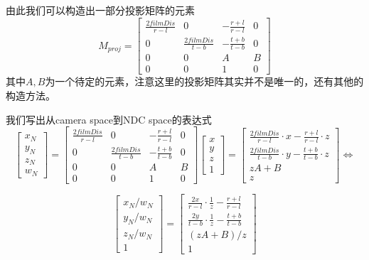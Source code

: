 由此我们可以构造出一部分投影矩阵的元素
\begin{displaymath}
M_{proj} = 
\begin{bmatrix}
\frac{2filmDis}{r - l} & 0  & -\frac{r + l}{r - l} & 0\\
0 & \frac{2filmDis}{t - b} & -\frac{t + b}{t - b} & 0\\
0 & 0 & A & B\\
0 & 0 & 1 & 0
\end{bmatrix}
\end{displaymath}
其中$A, B$为一个待定的元素，注意这里的投影矩阵其实并不是唯一的，还有其他的构造方法。

我们写出从camera space到NDC space的表达式
\begin{displaymath}
\begin{bmatrix}
x_N\\
y_N\\
z_N\\
w_N
\end{bmatrix} = 
\begin{bmatrix}
\frac{2filmDis}{r - l} & 0 & -\frac{r + l}{r - l} & 0\\
0 & \frac{2filmDis}{t - b} & -\frac{t + b}{t - b} & 0\\
0 & 0 & A & B\\
0 & 0 & 1 & 0
\end{bmatrix}
\begin{bmatrix}
x\\
y\\
z\\
1
\end{bmatrix} =
\left[\begin{gathered}
\frac{2filmDis}{r - l}\cdot x - \frac{r + l}{r - l} \cdot z\\
\frac{2filmDis}{t - b} \cdot y - \frac{t + b}{t - b}\cdot z\\
zA + B\\
z
\end{gathered}\right]\Leftrightarrow
\end{displaymath}

\begin{displaymath}
\begin{bmatrix}
x_N/w_N\\
y_N/w_N\\
z_N/w_N\\
1
\end{bmatrix} = 
\begin{bmatrix}
\frac{2x}{r - l}\cdot\frac{1}{z} - \frac{r + l}{r - l}\\
\frac{2y}{t - b}\cdot\frac{1}{z} - \frac{t + b}{t - b}\\
(zA + B) / z \\
1
\end{bmatrix}
\end{displaymath}

